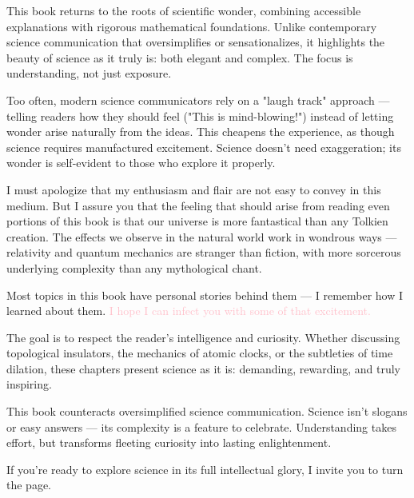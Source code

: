 This book returns to the roots of scientific wonder, combining accessible explanations with rigorous mathematical foundations. Unlike contemporary science communication that oversimplifies or sensationalizes, it highlights the beauty of science as it truly is: both elegant and complex. The focus is understanding, not just exposure.

Too often, modern science communicators rely on a "laugh track" approach — telling readers how they should feel ("This is mind-blowing!") instead of letting wonder arise naturally from the ideas. This cheapens the experience, as though science requires manufactured excitement. Science doesn't need exaggeration; its wonder is self-evident to those who explore it properly.

I must apologize that my enthusiasm and flair are not easy to convey in this medium. But I assure you that the feeling that should arise from reading even portions of this book is that our universe is more fantastical than any Tolkien creation. The effects we observe in the natural world work in wondrous ways — relativity and quantum mechanics are stranger than fiction, with more sorcerous underlying complexity than any mythological chant.

Most topics in this book have personal stories behind them — I remember how I learned about them. \textcolor{pink}{I hope I can infect you with some of that excitement.}

The goal is to respect the reader's intelligence and curiosity. Whether discussing topological insulators, the mechanics of atomic clocks, or the subtleties of time dilation, these chapters present science as it is: demanding, rewarding, and truly inspiring.

This book counteracts oversimplified science communication. Science isn't slogans or easy answers — its complexity is a feature to celebrate. Understanding takes effort, but transforms fleeting curiosity into lasting enlightenment.

If you’re ready to explore science in its full intellectual glory, I invite you to turn the page.

